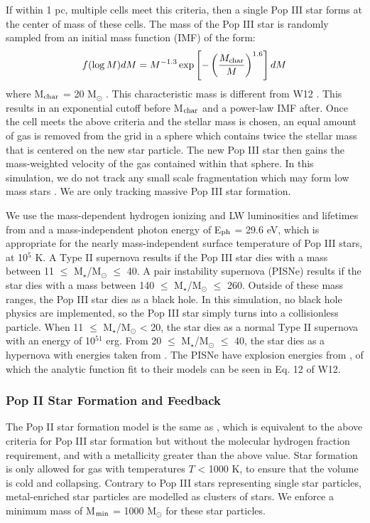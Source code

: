 \documentclass[a4paper,fleqn,usenatbib]{mnras}
\begin{document}
If within 1 pc, multiple cells meet this criteria, then a single Pop III star forms at the center of mass of these cells. The mass of the Pop III star is randomly sampled from an initial mass function (IMF) of the form:
\begin{equation} \label{IMF}
	f(\log M)dM = M^{-1.3} \exp \left[-\left( \frac{M_{\rm char}}{M}\right)^{1.6} \right]dM
\end{equation}
where M$_{\rm char}$ = 20 M$_{\odot}$ \citep{Hirano17}. This characteristic mass is different from W12 \citep{Hirano17}. This results in an exponential cutoff before M$_{\rm char}$ and a power-law IMF after. Once the cell meets the above criteria and the stellar mass is chosen, an equal amount of gas is removed from the grid in a sphere which contains twice the stellar mass that is centered on the new star particle. The new Pop III star then gains the mass-weighted velocity of the gas contained within that sphere. In this simulation, we do not track any small scale fragmentation which may form low mass stars \citep{Greif11_P3Cluster}. We are only tracking massive Pop III star formation.

We use the mass-dependent hydrogen ionizing and LW luminosities and lifetimes from \citet{Schaerer02} and a mass-independent photon energy of E$_{\rm ph}$ = 29.6 eV, which is appropriate for the nearly mass-independent surface temperature of Pop III stars, at 10$^{5}$ K. A Type II supernova results if the Pop III star dies with a mass between 11 $\leq$ M$_{\star}$/M$_{\odot}$ $\leq$ 40. A pair instability supernova (PISNe) results if the star dies with a mass between 140 $\leq$ M$_{\star}$/M$_{\odot}$ $\leq$ 260. Outside of these mass ranges, the Pop III star dies as a black hole. In this simulation, no black hole physics are implemented, so the Pop III star simply turns into a collisionless particle. When 11 $\leq$ M$_{\star}$/M$_{\odot}$ < 20, the star dies as a normal Type II supernova with an energy of 10$^{51}$ erg. From 20 $\leq$ M$_{\star}$/M$_{\odot}$ $\leq$ 40, the star dies as a hypernova with energies taken from \citet{Nomoto06}. The PISNe have explosion energies from \citet{2002ApJ...567..532H}, of which the analytic function fit to their models can be seen in Eq. 12 of W12. 

\subsubsection{Pop II  Star Formation and Feedback}
The Pop II star formation model is the same as \citet{Wise09}, which is equivalent to the above criteria for Pop III star formation but without the molecular hydrogen fraction requirement, and with a metallicity greater than the above value. Star formation is only allowed for gas with temperatures $T$ < 1000 K, to ensure that the volume is cold and collapsing. Contrary to Pop III stars representing single star particles, metal-enriched star particles are modelled as clusters of stars. We enforce a minimum mass of M$_{\rm min}$ = 1000 M$_{\odot}$ for these star particles. 
\end{document}
